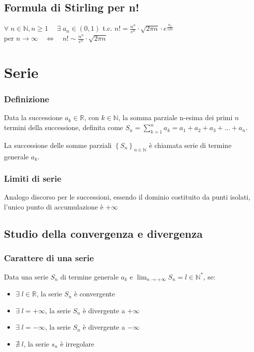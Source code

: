 \documentclass[a4paper]{article}
\begin{document}
\subsection{Formula di Stirling per n!}
\(\forall \; n \in \mathbb{N}, n \geq 1 \quad \; \exists \; a_n \in \left( 0, 1 \right)\) t.c. \(\displaystyle n! = \frac{n^n}{e^n} \cdot \sqrt{2 \pi n} \cdot e ^ {\frac{a_n}{12n}}\) \\
per \(n \to \infty \quad \Leftrightarrow \quad n! \sim \frac{n^n}{e^n} \cdot \sqrt{2 \pi n}\)

\section{Serie}
\subsubsection*{Definizione}
Data la successione \(a_k \in \mathbb{R}\), con \(k \in \mathbb{N}\), la somma parziale n-esima dei primi \(n\) termini della successione,
definita come \(\displaystyle S_n = \sum_{k = 1}^{n} a_k = a_1 + a_2 + a_3 + \dots + a_n\).

La successione delle somme parziali \(\left\{ S_n \right\}_{n \in \mathbb{N}}\) è chiamata serie di termine generale \(a_k\).

\subsubsection*{Limiti di serie}
Analogo discorso per le successioni, essendo il dominio costituito da punti isolati, l'unico punto di accumulazione è \(+ \infty\)

\subsection{Studio della convergenza e divergenza}
\subsubsection*{Carattere di una serie}
Data una serie \(S_n\) di termine generale \(a_k\) e \(\displaystyle \lim_{n \to +\infty} S_n = l \in \mathbb{N}^*\), se:
\begin{itemize}
	\item \(\exists \; l \in \mathbb{R}\), la serie \(S_n\) è convergente
	\item \(\exists \; l = + \infty\), la serie \(S_n\) è divergente a \(+ \infty\)
	\item \(\exists \; l = - \infty\), la serie \(S_n\) è divergente a \(- \infty\)
	\item \(\nexists \; l\), la serie \(s_n\) è irregolare
\end{itemize}
\end{document}
